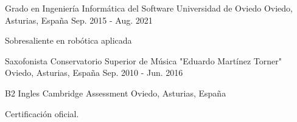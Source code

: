 

\begin{cventries}

  \cventry
  {Grado en Ingeniería Informática del Software} %
  {Universidad de Oviedo} %
  {Oviedo, Asturias, España} %
  {Sep. 2015 - Aug. 2021} %
  {
    \begin{cvitems} %
      \item {Sobresaliente en robótica aplicada}
    \end{cvitems}
  }

  \cventry
  {Saxofonista} %
  {Conservatorio Superior de Música "Eduardo Martínez Torner"} %
  {Oviedo, Asturias, España} %
  {Sep. 2010 - Jun. 2016} %
  {
    \begin{cvitems} %
    \end{cvitems}
  }

  \cventry
  {B2 Ingles} %
  {Cambridge Assessment} %
  {Oviedo, Asturias, España} %
  {} %
  {
    \begin{cvitems} %
      Certificación oficial.
    \end{cvitems}
  }

\end{cventries}
